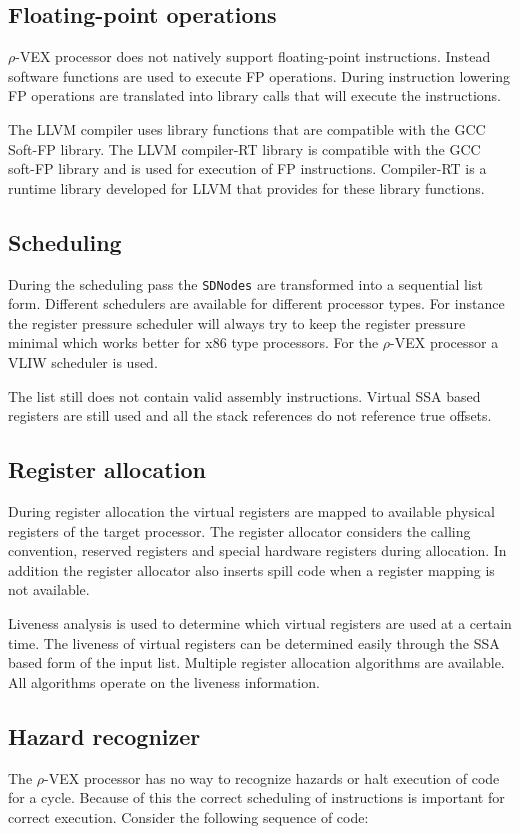 \subsection{Floating-point operations}
$\rho$-VEX processor does not natively support floating-point instructions. Instead software functions are used to execute FP operations. During instruction lowering FP operations are translated into library calls that will execute the instructions.

The LLVM compiler uses library functions that are compatible with the GCC Soft-FP library. The LLVM compiler-RT library is compatible with the GCC soft-FP library and is used for execution of FP instructions. Compiler-RT is a runtime library developed for LLVM that provides for these library functions.

\subsection{Scheduling}
During the scheduling pass the \texttt{SDNodes} are transformed into a sequential list form. Different schedulers are available for different processor types. For instance the register pressure scheduler will always try to keep the register pressure minimal which works better for x86 type processors. For the $\rho$-VEX processor a VLIW scheduler is used.

The list still does not contain valid assembly instructions. Virtual SSA based registers are still used and all the stack references do not reference true offsets.

\subsection{Register allocation}
During register allocation the virtual registers are mapped to available physical registers of the target processor. The register allocator considers the calling convention, reserved registers and special hardware registers during allocation. In addition the register allocator also inserts spill code when a register mapping is not available.

Liveness analysis is used to determine which virtual registers are used at a certain time. The liveness of virtual registers can be determined easily through the SSA based form of the input list. Multiple register allocation algorithms are available. All algorithms operate on the liveness information.

\subsection{Hazard recognizer}
The $\rho$-VEX processor has no way to recognize hazards or halt execution of code for a cycle. Because of this the correct scheduling of instructions is important for correct execution. Consider the following sequence of code:

